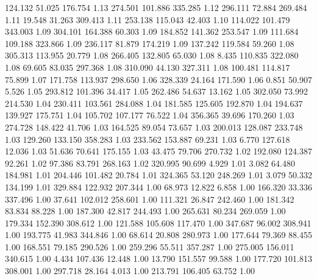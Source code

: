  124.132   51.025  176.754         1.13
 274.501  101.886  335.285         1.12
 296.111   72.884  269.484         1.11
  19.548   31.263  309.413         1.11
 253.138  115.043   42.403         1.10
 114.022  101.479  343.003         1.09
 304.101  164.388   60.303         1.09
 184.852  141.362  253.547         1.09
 111.684  109.188  323.866         1.09
 236.117   81.879  174.219         1.09
 137.242  119.584   59.260         1.08
 305.313  113.955   20.779         1.08
 266.405  132.805   65.030         1.08
   8.435  110.835  322.080         1.08
  69.605   83.035  297.368         1.08
 310.090   44.130  327.311         1.08
 100.481  114.817   75.899         1.07
 171.758  113.937  298.650         1.06
 328.339   24.164  171.590         1.06
   0.851   50.907    5.526         1.05
 293.812  101.396   34.417         1.05
 262.486   54.637   13.162         1.05
 302.050   73.992  214.530         1.04
 230.411  103.561  284.088         1.04
 181.585  125.605  192.870         1.04
 194.637  139.927  175.751         1.04
 105.702  107.177   76.522         1.04
 356.365   39.696  170.260         1.03
 274.728  148.422   41.706         1.03
 164.525   89.054   73.657         1.03
 200.013  128.087  233.748         1.03
 129.260  133.150  358.283         1.03
 233.562  153.887   69.231         1.03
   6.770  127.618   12.036         1.03
  51.636   70.641  175.155         1.03
  43.475   79.706  270.732         1.02
 192.080  124.387   92.261         1.02
  97.386   83.791  268.163         1.02
 320.995   90.699    4.929         1.01
   3.082   64.480  184.981         1.01
 204.446  101.482   20.784         1.01
 324.365   53.120  248.269         1.01
   3.079   50.332  134.199         1.01
 329.884  122.932  207.344         1.00
  68.973   12.822    6.858         1.00
 166.320   33.336  337.496         1.00
  37.641  102.012  258.601         1.00
 111.321   26.847  242.460         1.00
 181.342   83.834   88.228         1.00
 187.300   42.817  244.493         1.00
 265.631   80.234  269.059         1.00
 179.334  152.390  308.612         1.00
 121.588  105.608  117.470         1.00
 347.687   96.002  308.941         1.00
 193.775   41.983  344.846         1.00
  68.614   20.808  280.973         1.00
 177.644   79.369   88.455         1.00
 168.551   79.185  290.526         1.00
 259.296   55.511  357.287         1.00
 275.005  156.011  340.615         1.00
   4.434  107.436   12.448         1.00
  13.790  151.557   99.588         1.00
 177.720  101.813  308.001         1.00
 297.718   28.164    4.013         1.00
 213.791  106.405   63.752         1.00
